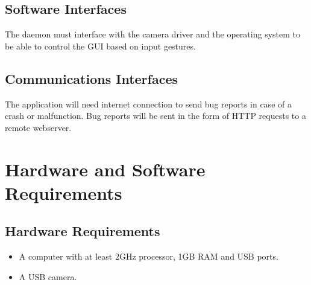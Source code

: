 \documentclass[11pt]{report}
\begin{document}
\subsection{Software Interfaces}
The daemon must interface with the camera driver and the operating system to be able to control the GUI based on input gestures.

\subsection{Communications Interfaces}
The application will need internet connection to send bug reports in case of a crash or malfunction. Bug reports will be sent in the form of HTTP requests to a remote webserver.


\newpage
\section{Hardware and Software Requirements}
\subsection{Hardware Requirements}
\begin{itemize}
    \item A computer with at least 2GHz processor, 1GB RAM and USB ports.
    \item A USB camera.
\end{itemize}
\end{document}
